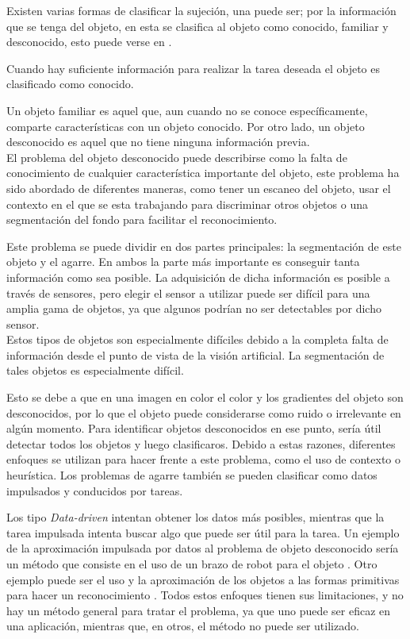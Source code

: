 Existen varias formas de clasificar la sujeción, una puede ser; por la información que se tenga del objeto, en esta se clasifica al objeto como conocido, familiar y desconocido, esto puede verse en \cite{bohg2014data,el20113d,carlos2013survey,zaharescuobject}.

Cuando hay suficiente información para realizar la tarea deseada el objeto es clasificado como conocido.

Un objeto familiar es aquel que, aun cuando no se conoce específicamente, comparte características con un objeto conocido. Por otro lado, un objeto desconocido es aquel que no tiene ninguna información previa. \\

El problema del objeto desconocido puede describirse como la falta de conocimiento de cualquier característica importante del objeto, este problema ha sido abordado de diferentes maneras, como tener un escaneo del objeto, usar el contexto en el que se esta trabajando para discriminar otros objetos o una segmentación del fondo para facilitar el reconocimiento.

Este problema se puede dividir en dos partes principales: la segmentación de este objeto y el agarre. En ambos la parte más importante es conseguir tanta información como sea posible. La adquisición de dicha información es posible a través de sensores, pero elegir el sensor a utilizar puede ser difícil para una amplia gama de objetos, ya que algunos podrían no ser detectables por dicho sensor. \\

Estos tipos de objetos son especialmente difíciles debido a la completa falta de información desde el punto de vista de la visión artificial. La segmentación de tales objetos es especialmente difícil.

Esto se debe a que en una imagen en color el color y los gradientes del objeto son desconocidos, por lo que el objeto puede considerarse como ruido o irrelevante en algún momento. Para identificar objetos desconocidos en ese punto, sería útil detectar todos los objetos y luego clasificaros. Debido a estas razones, diferentes enfoques se utilizan para hacer frente a este problema, como el uso de contexto o heurística. Los problemas de agarre también se pueden clasificar como datos impulsados ​​y conducidos por tareas.


Los tipo \textit{Data-driven} intentan obtener los datos más posibles, mientras que la tarea impulsada intenta buscar algo que puede ser útil para la tarea. Un ejemplo de la aproximación impulsada por datos al problema de objeto desconocido sería un método que consiste en el uso de un brazo de robot para el objeto \cite{kaneko1994contact}. Otro ejemplo puede ser el uso y la aproximación de los objetos a las formas primitivas para hacer un reconocimiento \cite{fornas2016fitting, felip2009robust, miller2003automatic, huebner2008selection}. Todos estos enfoques tienen sus limitaciones, y no hay un método general para tratar el problema, ya que uno puede ser eficaz en una aplicación, mientras que, en otros, el método no puede ser utilizado.

